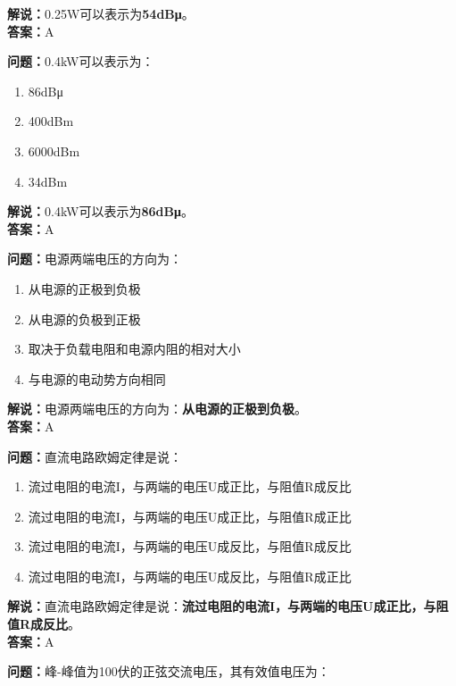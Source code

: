 \textbf{解说：}0.25W可以表示为\textbf{54dBμ}。\\\textbf{答案：}A%



\textbf{问题：}0.4kW可以表示为：

\begin{enumerate}[label=\Alph*), leftmargin=1cm]
	\item 86dBμ
	\item 400dBm
	\item 6000dBm
	\item 34dBm
\end{enumerate}

\textbf{解说：}0.4kW可以表示为\textbf{86dBμ}。\\\textbf{答案：}A%



\textbf{问题：}电源两端电压的方向为：

\begin{enumerate}[label=\Alph*), leftmargin=1cm]
	\item 从电源的正极到负极
	\item 从电源的负极到正极
	\item 取决于负载电阻和电源内阻的相对大小
	\item 与电源的电动势方向相同
\end{enumerate}

\textbf{解说：}电源两端电压的方向为：\textbf{从电源的正极到负极}。\\\textbf{答案：}A



\textbf{问题：}直流电路欧姆定律是说：

\begin{enumerate}[label=\Alph*), leftmargin=1cm]
	\item 流过电阻的电流I，与两端的电压U成正比，与阻值R成反比
	\item 流过电阻的电流I，与两端的电压U成正比，与阻值R成正比
	\item 流过电阻的电流I，与两端的电压U成反比，与阻值R成反比
	\item 流过电阻的电流I，与两端的电压U成反比，与阻值R成正比
\end{enumerate}

\textbf{解说：}直流电路欧姆定律是说：\textbf{流过电阻的电流I，与两端的电压U成正比，与阻值R成反比}。\\\textbf{答案：}A%



\textbf{问题：}峰-峰值为100伏的正弦交流电压，其有效值电压为：


